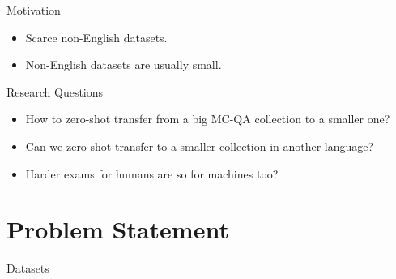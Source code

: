 \documentclass[]{beamer}
\def\mAlertSpace{\vspace{0.5em}}
\begin{document}
  \begin{frame}{\secname}
    \begin{alertblock}{Motivation}
      \begin{itemize}
        \item Scarce non-English datasets.
        \item Non-English datasets are usually small.
      \end{itemize}
    \end{alertblock}
  \end{frame}
  

  \begin{frame}{\secname}
    \begin{alertblock}{Research Questions}
      \begin{itemize}
        \item How to zero-shot transfer from a big MC-QA collection to a smaller one?
        \item Can we zero-shot transfer to a smaller collection in another language?
        \item Harder exams for humans are so for machines too?
      \end{itemize}
    \end{alertblock}
  \end{frame}

\section{Problem Statement}
  \begin{frame}{\secname}
    \begin{alertblock}{Datasets}
      \mAlertSpace
      
    \end{alertblock}
  \end{frame}
\end{document}
